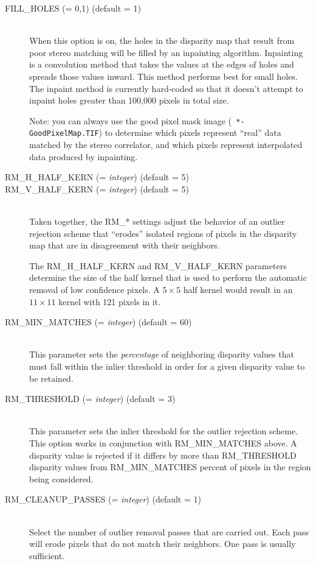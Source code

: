 \begin{description}

\item[FILL\_HOLES \textnormal{\small{(= 0,1)}} (default = 1)] \hfill \\
  When this option is on, the holes in the disparity map that result
  from poor stereo matching will be filled by an inpainting
  algorithm. Inpainting is a convolution method that takes the values
  at the edges of holes and spreads those values inward. This method
  performs best for small holes. The inpaint method is currently
  hard-coded so that it doesn't attempt to inpaint holes greater than
  100,000 pixels in total size.

  Note: you can always use the good pixel mask image ({\tt
    *-GoodPixelMap.TIF}) to determine which pixels represent ``real''
  data matched by the stereo correlator, and which pixels represent
  interpolated data produced by inpainting.

\item[RM\_H\_HALF\_KERN \textnormal{\small{(= \emph{integer})}} (default = 5)]
\item[RM\_V\_HALF\_KERN \textnormal{\small{(= \emph{integer})}} (default = 5)] \hfill \\
  Taken together, the RM\_* settings adjust the behavior of an outlier
  rejection scheme that ``erodes'' isolated regions of pixels in the
  disparity map that are in disagreement with their neighbors.

  The RM\_H\_HALF\_KERN and RM\_V\_HALF\_KERN parameters determine the
  size of the half kernel that is used to perform the automatic
  removal of low confidence pixels.  A $5 \times 5$ half kernel
  would result in an $11 \times 11$ kernel with 121 pixels in it.

\item[RM\_MIN\_MATCHES \textnormal{\small{(= \emph{integer})}} (default = 60)] \hfill \\
  This parameter sets the {\em percentage} of neighboring disparity
  values that must fall within the inlier threshold in order for a
  given disparity value to be retained.

\item[RM\_THRESHOLD \textnormal{\small{(= \emph{integer})}} (default = 3)] \hfill \\
  This parameter sets the inlier threshold for the outlier rejection
  scheme.  This option works in conjunction with RM\_MIN\_MATCHES
  above.  A disparity value is rejected if it differs by more than
  RM\_THRESHOLD disparity values from RM\_MIN\_MATCHES percent of
  pixels in the region being considered.

\item[RM\_CLEANUP\_PASSES \textnormal{\small{(= \emph{integer})}} (default = 1)] \hfill \\
  Select the number of outlier removal passes that are carried out.
  Each pass will erode pixels that do not match their neighbors.  One
  pass is usually sufficient.

\end{description}

